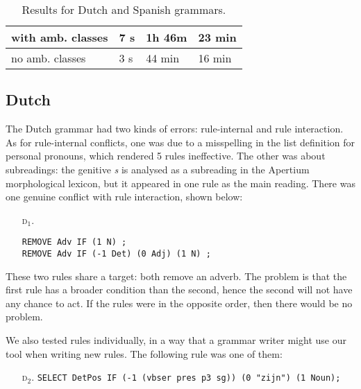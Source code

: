 {{\begin{table}[h]
\begin{tabular}{|p{2.84cm}|p{1cm}|p{1.15cm}|p{1.55cm}|}
\clock{} with amb. 
           classes & 7 s        & 1h 46m   &  23 min  \\ \hline

\clock{} no amb. 
           classes & 3 s        & 44 min       & 16 min     \\ \hline 


\end{tabular}
\caption{Results for Dutch and Spanish grammars.}
\label{table:res}
\end{table}

\subsection{Dutch} The Dutch grammar had two kinds of errors: rule-internal and rule interaction. As for rule-internal conflicts, one was due to a misspelling in the list definition for personal pronouns, which rendered 5 rules ineffective. The other was about subreadings: the genitive \emph{s} is analysed as a subreading in the Apertium morphological lexicon, but it appeared in one rule as the main reading. 
There was one genuine conflict with rule interaction, shown below:

\begin{itemize}
\item[\textsc{d$_1$.}] 
\begin{verbatim}REMOVE Adv IF (1 N) ;
REMOVE Adv IF (-1 Det) (0 Adj) (1 N) ;
\end{verbatim}
\end{itemize}

\noindent These two rules share a target: both remove an adverb.
The problem is that the first rule has a broader condition than the second, hence the second will not have any chance to act. 
If the rules were in the opposite order, then there would be no problem.



We also tested rules individually, in a way that a grammar writer might use our tool when writing new rules.
The following rule was one of them:

\begin{itemize}
\item[\textsc{d$_2$.}] 
\texttt{SELECT DetPos IF (-1 (vbser pres p3 sg)) (0 "zijn") (1 Noun);}
\end{itemize} 

}}
